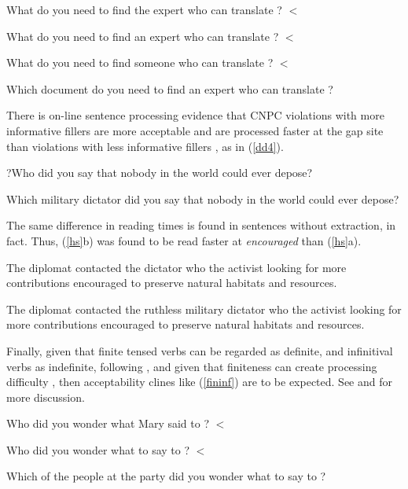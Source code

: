 \documentclass[output=paper]{langsci/langscibook}
\begin{document}
\ea \label{k}
\ea What do you need to find the expert who can translate \spc?  $<$
\item What do you need to find an expert who can translate \spc?   $<$
\item What do you need to find someone who can translate \spc? $<$
\item Which document do you need to find an expert who can translate \spc?
\z
\z

\indent
There is on-line sentence processing evidence that   CNPC   violations  with more informative  fillers are more acceptable and are processed faster at the gap site than violations with less informative fillers \citep{hofsaglang}, as in  (\ref{dd4}).
 
\ea \label{dd4}
\ea ?Who  did you say that nobody in the world could ever depose?
\item Which  military dictator did you say that nobody in the world 
could ever depose?
\z
\z


\noindent
The same difference in reading times  is found in sentences without extraction, in fact. Thus,   (\ref{hs}b) was found to be read faster at \emph{encouraged} than (\ref{hs}a).
 
\ea \label{hs}
 \ea The diplomat contacted the dictator who the activist looking for more contributions encouraged to preserve natural habitats and resources.
 
 \item The diplomat contacted the ruthless military dictator who the activist looking for more contributions encouraged to preserve natural habitats and resources.
 \z
\z

\noindent
Finally, given that  finite tensed verbs can be regarded as definite, and infinitival verbs as indefinite,
 following \citet{partee84}, and given that finiteness can create processing difficulty 
 \citep{kluender92,gibson0000}, then acceptability clines like 
(\ref{fininf}) are to be expected. See \citet[ch.5]{levhubook} and \citet[308]{levine17} for more discussion.

\ea 
\ea Who did you wonder what Mary said to \spc?  $<$
\item Who did you wonder what to say to \spc?  $<$
\item Which of the people at the party did you wonder what to say to \spc? 
\z \label{fininf}
\z
\end{document}
